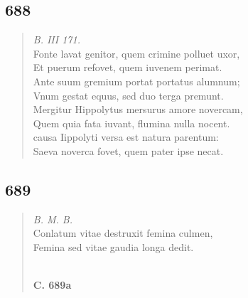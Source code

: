 \documentclass[11pt, a4paper]{report}
\begin{document}
            \subsection*{688}
      \begin{verse}
      \textit{B. III 171.} \\ Fonte lavat genitor, quem crimine polluet uxor, \\ Et puerum refovet, quem iuvenem perimat. \\ Ante suum gremium portat portatus alumnum; \\ Vnum gestat equus, sed duo terga premunt. \\ Mergitur Hippolytus mersurus amore novercam, \\ Quem quia fata iuvant, flumina nulla nocent. \\ causa Iippolyti versa est natura parentum: \\ Saeva noverca fovet, quem pater ipse necat. \\ 
      \end{verse}
  
            \subsection*{689}
      \begin{verse}
      \textit{B. M. B.} \\ Conlatum vitae destruxit femina culmen, \\ Femina sed vitae gaudia longa dedit. \\ 
        ﻿\pagebreak 
    \begin{center} \textbf{C. 689a} \end{center} \marginpar{[162]} 
      \end{verse}
  
\end{document}
